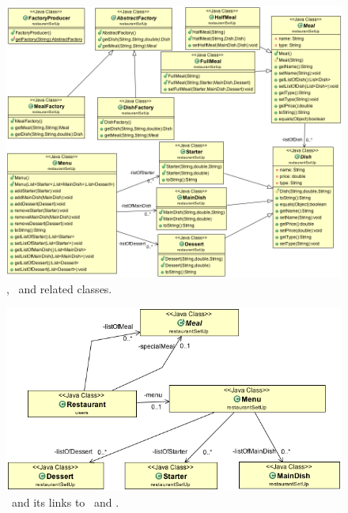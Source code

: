 \begin{figure}
  \begin{center}
    \includegraphics[scale=0.5]{./img/DishAndMeal.png}
    \end{center}
  \caption{\umld \Dish, \Meal~and related classes.}
  \label{fig:dish_meal_uml}
\end{figure}
\begin{figure}
  \begin{center}
    \includegraphics[scale=0.5]{./img/RestaurantToDishAndMeal.png}
    \end{center}
  \caption{\umld \Restaurant~and its links to \Dish~and \Meal.}
  \label{fig:restaurant_dish_meal_uml}
\end{figure}
